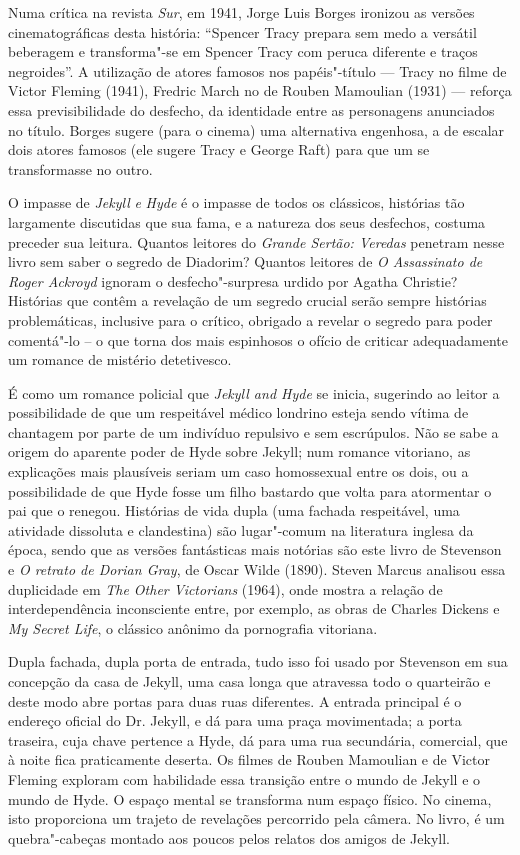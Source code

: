 Numa crítica na revista \textit{Sur}, em 1941, Jorge Luis Borges
ironizou as versões cinematográficas desta história: “Spencer Tracy
prepara sem medo a versátil beberagem e transforma"-se em Spencer Tracy
com peruca diferente e traços negroides”.  A utilização de atores
famosos nos papéis"-título --- Tracy no filme de Victor Fleming (1941),
Fredric March no de Rouben Mamoulian (1931) --- reforça essa
previsibilidade do desfecho, da identidade entre as personagens
anunciados no título. Borges sugere (para o cinema) uma alternativa
engenhosa, a de escalar dois atores famosos (ele sugere Tracy e George
Raft) para que um se transformasse no outro.  

O impasse de \textit{Jekyll }\textit{e}\textit{ Hyde} é o impasse de
todos os clássicos, histórias tão largamente discutidas que sua fama, e
a natureza dos seus desfechos, costuma preceder sua leitura.  Quantos
leitores do \textit{Grande Sertão: Veredas} penetram nesse livro sem
saber o segredo de Diadorim?  Quantos leitores de \textit{O Assassinato
de Roger Ackroyd} ignoram o desfecho"-surpresa urdido por Agatha
\mbox{Christie?}  Histórias que contêm a revelação de um segredo crucial serão
sempre histórias problemáticas, inclusive para o crítico, obrigado a
revelar o segredo para poder comentá"-lo – o que torna dos mais
espinhosos o ofício de criticar adequadamente um romance de mistério
detetivesco.

É como um romance policial que \textit{Jekyll and Hyde} se inicia,
sugerindo ao leitor a possibilidade de que um respeitável médico
londrino esteja sendo vítima de chantagem por parte de um indivíduo
repulsivo e sem escrúpulos.  Não se sabe a origem do aparente poder de
Hyde sobre Jekyll; num romance vitoriano, as explicações mais
plausíveis seriam um caso homossexual entre os dois, ou a possibilidade
de que Hyde fosse um filho bastardo que volta para atormentar o pai que
o renegou.  Histórias de vida dupla (uma fachada respeitável, uma
atividade dissoluta e clandestina) são lugar{}"-comum na literatura
inglesa da época, sendo que as versões fantásticas mais notórias são
este livro de Stevenson e \textit{O retrato de Dorian
Gray}, de Oscar Wilde (1890).  Steven Marcus analisou essa duplicidade
em \textit{The Other Victorians} (1964), onde mostra a relação de
interdependência inconsciente entre, por exemplo, as obras de Charles
Dickens e \textit{My Secret Life}, o clássico anônimo da pornografia
vitoriana. 

Dupla fachada, dupla porta de entrada, tudo isso foi usado por Stevenson
em sua concepção da casa de Jekyll, uma casa longa que atravessa todo o
quarteirão e deste modo abre portas para duas ruas diferentes.  A
entrada principal é o endereço oficial do Dr. Jekyll, e dá para uma
praça movimentada; a porta traseira, cuja chave pertence a Hyde, dá
para uma rua secundária, comercial, que à noite fica praticamente
deserta.  Os filmes de Rouben Mamoulian e de Victor Fleming exploram
com habilidade essa transição entre o mundo de Jekyll e o mundo de
Hyde.  O espaço mental se transforma num espaço físico. No cinema, isto
proporciona um trajeto de revelações percorrido pela câmera. No livro,
é um quebra"-cabeças montado aos poucos pelos relatos dos amigos de
Jekyll. 
\pagebreak
\pagebreak

